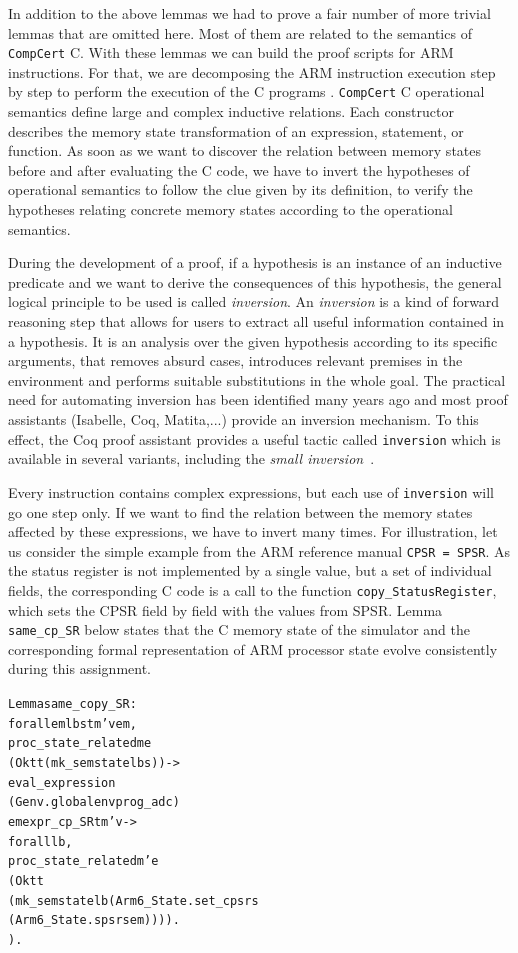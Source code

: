 \documentclass[twocolumn]{article}
\newcommand{\coqdockw}[1]{\texttt{#1}}
\newcommand{\inversion}{\coqdockw{inversion}\xspace}
\newcommand{\compcert}{\texttt{CompCert}\xspace}
\begin{document}
In addition to the above lemmas we had to prove a fair number of more
trivial lemmas that are omitted here.  Most of them are related to the
semantics of \compcert C.  With these lemmas we can build the proof
scripts for ARM instructions.  For that, we are decomposing the ARM
instruction execution step by step to perform the execution of
the C programs . \compcert C operational semantics define large and
complex inductive relations. Each constructor describes the
memory state transformation of an expression, statement, or function.
As soon as we want to discover the relation between memory states
before and after evaluating the C code, we have to invert the
hypotheses of operational semantics to follow the clue given by its
definition, to verify the hypotheses relating concrete memory states
according to the operational semantics.

During the development of a proof, if a hypothesis is an instance of
an inductive predicate and we want to derive the consequences of this
hypothesis, the general logical principle to be used is called
\emph{inversion}. An {\em inversion} is a kind of forward reasoning
step that allows for users to extract all useful information contained
in a hypothesis.  It is an analysis over the given hypothesis according
to its specific arguments, that removes absurd cases, introduces
relevant premises in the environment and performs suitable
substitutions in the whole goal.  The practical need for automating
inversion has been identified many years ago and most proof assistants
(Isabelle, Coq, Matita,...)  provide an inversion mechanism.  To this
effect, the Coq proof assistant provides a useful tactic called
\inversion \cite{coqmanual} which is available in several variants,
including the {\em small inversion}~\cite{small-inversion}.

Every instruction contains complex expressions, but each use of
\inversion will go one step only.  If we want to find the relation
between the memory states affected by these expressions, we have to
invert many times. For illustration, let us consider the simple
example from the ARM reference manual \texttt{CPSR = SPSR}.  As
the status register is not implemented by a single value, but a set of
individual fields, the corresponding C code is a call to the function
\texttt{copy\_StatusRegister}, which sets the CPSR field by field with
the values from SPSR.  Lemma \texttt{same\_cp\_SR} below states that
the C memory state of the simulator and the corresponding formal
representation of ARM processor state evolve consistently during this
assignment.
\begin{alltt}\small
Lemma same_copy_SR :
  forall e m l b s t m' v em,
  proc_state_related m e
   (Ok tt (mk_semstate l b s)) ->
      eval_expression
       (Genv.globalenv prog_adc)
                       e m expr_cp_SR t m' v ->
        forall l b,
         proc_state_related m' e
         (Ok tt
           (mk_semstate l b (Arm6_State.set_cpsr s
                            (Arm6_State.spsr s em)))).
   ).
\end{alltt}
\end{document}
